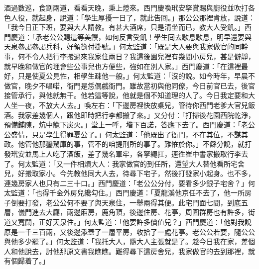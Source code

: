 酒過數巡，食割兩道，看看天晚，秉上燈來。西門慶喚玳安拏賞賜與廚役並吹打各色人役，就起身，說道：「學生厚擾一日了，就此告囘。」那公公那裡肯放，說道：「我今日正下班，要與大人請教。有甚大酒席，只是清坐而已，教大人受飢。」西門慶道：「承老公公賜這等美饌，如何反言受飢！學生囘去歇息歇息，明早還要與天泉叅謁叅謁兵科，好領箚付掛號。」何太監道：「既是大人要與我家做官的同幹事，何不令人把行李搬過來我家住兩日？我這後園兒裡有幾間小房兒，甚是僻靜，就早晚和做官的理會些公事兒也方便些，強如在別人家。」西門慶道：「在這裡最好，只是使夏公見恠，相學生疎他一般。」何太監道：「沒的說。如今時年，早晨不做官，晚夕不唱喏，衙門是恁偶戲衙門。{}雖故當初與他同僚，今日前官已去，後官接管承行，與他就無干。他若這等說，他就是個不知道理的人了。{}今日我定要和大人坐一夜，不放大人去。」喚左右：「下邊房裡快放桌兒，管待你西門老爹大官兒飯酒。我家差幾個人，跟他即時把行李都搬了來。」又分付：「打掃後花園西院乾淨，預備鋪陳，炕中籠下炭火。」堂上一呼，堦下百諾，答應下去了。西門慶道：「老公公盛情，只是學生得罪夏公了。」何太監道：「他既出了衙門，不在其位，不謀其政。他管他那鑾駕庫的事，{}管不的咱提刑所的事了。難恠於你。」不繇分說，就打發玳安並馬上人吃了酒飯，差了幾名軍牢，各拏繩扛，逕徃崔中書家搬取行李去了。何太監道：「又一件相煩大人：我家做官的到任所，還望大人替他看所宅舍兒，好搬取家小。今先教他同大人去，待尋下宅子，然後打發家小起身。也不多，連幾房家人也只有二三十口。」西門慶道：「老公公分付，要看多少銀子宅舍？」何太監道：「也得千金外房兒纔勾住。」西門慶道：「夏龍溪他京任不去了，他一所房子倒要打發，老公公何不要了與天泉住，一舉兩得其便。此宅門面七間，到底五層，儀門進去大廳，兩邊廂房，鹿角頂，後邊住房、花亭，周圍群房也有許多，街道又寬闊，正好天泉住。」何太監道：「他要許多價值兒？」西門慶道：「他對我說原是一千三百兩，又後邊添蓋了一層平房，收拾了一處花亭。老公公若要，隨公公與他多少罷了。」何太監道：「我托大人，隨大人主張就是了。趁今日我在家，差個人和他說去，討他那原文書我瞧瞧。難得尋下這房舍兒，我家做官的去到那裡，就有個歸着了。」

